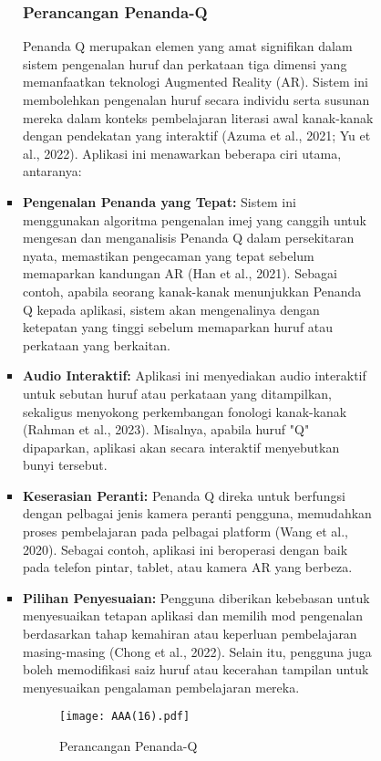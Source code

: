 \begin{itemize}
\begin{itemize}
\begin{itemize}
\begin{itemize}
\begin{itemize}
\subsubsection{ Perancangan Penanda-Q}
Penanda Q merupakan elemen yang amat signifikan dalam sistem pengenalan huruf dan perkataan tiga dimensi yang memanfaatkan teknologi Augmented Reality (AR). Sistem ini membolehkan pengenalan huruf secara individu serta susunan mereka dalam konteks pembelajaran literasi awal kanak-kanak dengan pendekatan yang interaktif (Azuma et al., 2021; Yu et al., 2022). Aplikasi ini menawarkan beberapa ciri utama, antaranya:  \\  
 
\item \textbf{Pengenalan Penanda yang Tepat:} Sistem ini menggunakan algoritma pengenalan imej yang canggih untuk mengesan dan menganalisis Penanda Q dalam persekitaran nyata, memastikan pengecaman yang tepat sebelum memaparkan kandungan AR (Han et al., 2021). Sebagai contoh, apabila seorang kanak-kanak menunjukkan Penanda Q kepada aplikasi, sistem akan mengenalinya dengan ketepatan yang tinggi sebelum memaparkan huruf atau perkataan yang berkaitan.\\  
\item \textbf{Audio Interaktif:} Aplikasi ini menyediakan audio interaktif untuk sebutan huruf atau perkataan yang ditampilkan, sekaligus menyokong perkembangan fonologi kanak-kanak (Rahman et al., 2023). Misalnya, apabila huruf "Q" dipaparkan, aplikasi akan secara interaktif menyebutkan bunyi tersebut.\\  
\item \textbf{Keserasian Peranti:} Penanda Q direka untuk berfungsi dengan pelbagai jenis kamera peranti pengguna, memudahkan proses pembelajaran pada pelbagai platform (Wang et al., 2020). Sebagai contoh, aplikasi ini beroperasi dengan baik pada telefon pintar, tablet, atau kamera AR yang berbeza.\\  
\item \textbf{Pilihan Penyesuaian:} Pengguna diberikan kebebasan untuk menyesuaikan tetapan aplikasi dan memilih mod pengenalan berdasarkan tahap kemahiran atau keperluan pembelajaran masing-masing (Chong et al., 2022). Selain itu, pengguna juga boleh memodifikasi saiz huruf atau kecerahan tampilan untuk menyesuaikan pengalaman pembelajaran mereka. 
\clearpage
\begin{figure}[h]
    \centering
    \texttt{[image: AAA(16).pdf]}
    \caption{Perancangan Penanda-Q}
    \label{fig:enter-label}
\end{figure}
\clearpage

\end{itemize}
\end{itemize}
\end{itemize}
\end{itemize}
\end{itemize}
